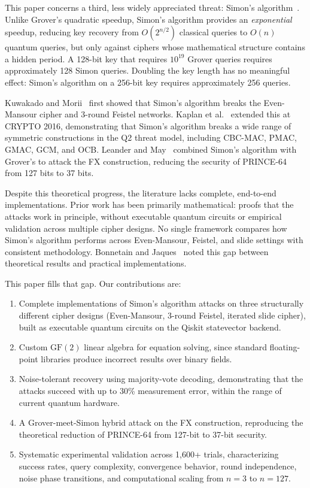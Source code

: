 \documentclass[11pt]{article}
\begin{document}
This paper concerns a third, less widely appreciated threat: Simon's algorithm~\cite{simon1997}. Unlike Grover's quadratic speedup, Simon's algorithm provides an \emph{exponential} speedup, reducing key recovery from $O(2^{n/2})$ classical queries to $O(n)$ quantum queries, but only against ciphers whose mathematical structure contains a hidden period. A 128-bit key that requires $10^{19}$ Grover queries requires approximately 128 Simon queries. Doubling the key length has no meaningful effect: Simon's algorithm on a 256-bit key requires approximately 256 queries.

Kuwakado and Morii~\cite{kuwakado2010,kuwakado2012} first showed that Simon's algorithm breaks the Even-Mansour cipher and 3-round Feistel networks. Kaplan et al.~\cite{kaplan2016} extended this at CRYPTO 2016, demonstrating that Simon's algorithm breaks a wide range of symmetric constructions in the Q2 threat model, including CBC-MAC, PMAC, GMAC, GCM, and OCB. Leander and May~\cite{leander2017} combined Simon's algorithm with Grover's to attack the FX construction, reducing the security of PRINCE-64 from 127 bits to 37 bits.

Despite this theoretical progress, the literature lacks complete, end-to-end implementations. Prior work has been primarily mathematical: proofs that the attacks work in principle, without executable quantum circuits or empirical validation across multiple cipher designs. No single framework compares how Simon's algorithm performs across Even-Mansour, Feistel, and slide settings with consistent methodology. Bonnetain and Jaques~\cite{bonnetain2022} noted this gap between theoretical results and practical implementations.

This paper fills that gap. Our contributions are:

\begin{enumerate}
    \item Complete implementations of Simon's algorithm attacks on three structurally different cipher designs (Even-Mansour, 3-round Feistel, iterated slide cipher), built as executable quantum circuits on the Qiskit statevector backend.
    \item Custom $\text{GF}(2)$ linear algebra for equation solving, since standard floating-point libraries produce incorrect results over binary fields.
    \item Noise-tolerant recovery using majority-vote decoding, demonstrating that the attacks succeed with up to 30\% measurement error, within the range of current quantum hardware.
    \item A Grover-meet-Simon hybrid attack on the FX construction, reproducing the theoretical reduction of PRINCE-64 from 127-bit to 37-bit security.
    \item Systematic experimental validation across 1,600+ trials, characterizing success rates, query complexity, convergence behavior, round independence, noise phase transitions, and computational scaling from $n=3$ to $n=127$.
\end{enumerate}
\end{document}
